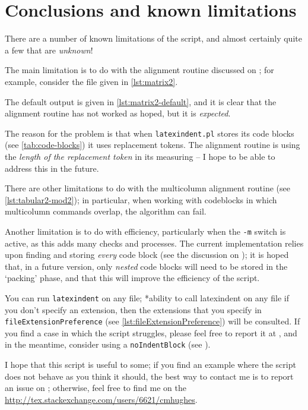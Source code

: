 \section{Conclusions and known limitations}\label{sec:knownlimitations}
 There are a number of known limitations of the script, and almost certainly quite a few
 that are \emph{unknown}!

 The main limitation is to do with the alignment routine discussed on
 ; for example, consider the file given in \cref{lst:matrix2}.


 The default output is given in \cref{lst:matrix2-default}, and it is clear that the alignment
 routine has not worked as hoped, but it is \emph{expected}. 

 The reason for the problem is that when \texttt{latexindent.pl} stores its code blocks
 (see \vref{tab:code-blocks}) it uses replacement tokens. The alignment routine is using
 the \emph{length of the replacement token} in its measuring -- I hope to be able to address this in the
 future.

 There are other limitations to do with the multicolumn alignment routine (see
 \vref{lst:tabular2-mod2}); in particular, when working with codeblocks in which multicolumn
 commands overlap, the algorithm can fail.

 Another limitation is to do with efficiency, particularly when the \texttt{-m}
 switch is active, as this adds many checks and processes. The current implementation
 relies upon finding and storing \emph{every} code block (see the discussion on
 ); it is hoped that, in a future version, only
 \emph{nested} code blocks will need to be stored in the `packing' phase, and
 that this will improve the efficiency of the script.

 You can run \texttt{latexindent} on any file;%
 *{ability to call latexindent on any file} if you don't specify an extension, then the extensions that you
 specify in \lstinline[breaklines=true]!fileExtensionPreference! (see \vref{lst:fileExtensionPreference}) will be consulted. If you
 find a case in which the script struggles, please feel free to report it at
 \cite{latexindent-home}, and in the meantime, consider using a \texttt{noIndentBlock} (see ).

 I hope that this script is useful to some; if you find an example where the script does
 not behave as you think it should, the best way to contact me is to report an issue on
 \cite{latexindent-home}; otherwise, feel free to find me on the \url{http://tex.stackexchange.com/users/6621/cmhughes}.

